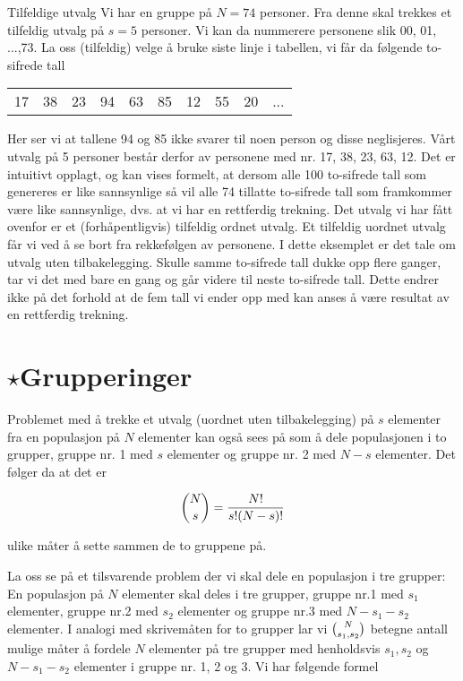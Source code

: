 \begin{eksempel}{Tilfeldige utvalg}
Vi har en gruppe på $N=74$ personer. Fra denne skal trekkes et
tilfeldig utvalg på $s=5$ personer. Vi kan da nummerere personene
slik 00, 01, ...,73. La oss (tilfeldig) velge å bruke siste linje
i tabellen, vi får da følgende to-sifrede tall
\begin{center}
\begin{tabular}{cccccccccc}
    17&38&23&94&63&85&12&55&20&... \\
\end{tabular}
\end{center}
\noindent Her ser vi at tallene 94 og 85 ikke svarer til noen person og
disse neglisjeres. Vårt utvalg på 5 personer består derfor av
personene med nr. 17, 38, 23, 63, 12. Det er intuitivt opplagt, og
kan vises formelt, at dersom alle 100 to-sifrede tall som
genereres er like sannsynlige så vil alle 74 tillatte to-sifrede
tall som framkommer være like sannsynlige, dvs. at vi har en
rettferdig trekning. Det utvalg vi har fått ovenfor er et
(forhåpentligvis) tilfeldig ordnet utvalg. Et tilfeldig uordnet
utvalg får vi ved å se bort fra rekkefølgen av personene. I dette
eksemplet er det tale om utvalg uten tilbakelegging. Skulle samme
to-sifrede tall dukke opp flere ganger, tar vi det med bare en
gang og går videre til neste to-sifrede tall. Dette endrer ikke på
det forhold at de fem tall vi ender opp med kan anses å være
resultat av en rettferdig trekning.
\end{eksempel}

\section{$\star$Grupperinger}
\small

Problemet med å trekke et utvalg (uordnet uten tilbakelegging) på
$s$ elementer fra en populasjon på $N$ elementer kan også sees på
som å dele populasjonen i to grupper, gruppe nr. 1 med $s$
elementer og gruppe nr. 2 med $N-s$ elementer. Det følger da at
det er

\[ {{N}\choose{s}}=\frac{N!}{s!(N-s)!} \]

\noindent ulike måter å sette sammen de to gruppene på.
                                   
     La oss se på et tilsvarende problem der vi skal dele en
 populasjon i tre grupper: En populasjon på $N$ elementer skal
deles i tre grupper, gruppe nr.1 med $s_1$ elementer, gruppe nr.2
med $s_2$ elementer og gruppe nr.3 med $N-s_1-s_2$ elementer.
I analogi med skrivemåten for to grupper lar vi ${{N}\choose{s_1,s_2}}$ betegne
antall mulige måter å fordele $N$ elementer på tre grupper med
henholdsvis $s_1, s_2$ og $N-s_1-s_2$ elementer i gruppe nr. 1, 2
og 3. Vi har følgende formel

